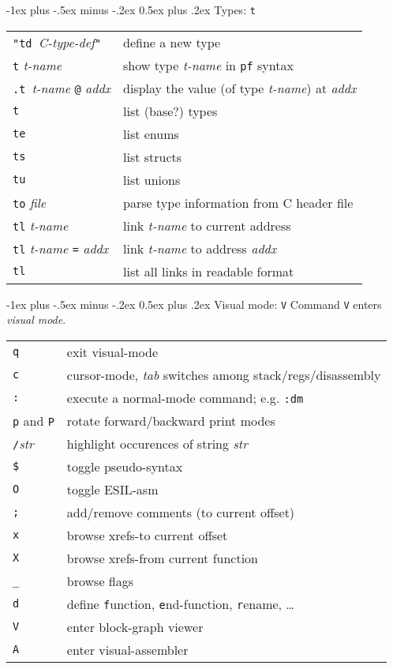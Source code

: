 \documentclass[a4paper,landscape]{article}
\makeatletter
\renewcommand{\section}{\@startsection{section}{1}{0mm}%
                                {-1ex plus -.5ex minus -.2ex}%
                                {0.5ex plus .2ex}%
                                {\normalfont\large\bfseries}}
\makeatother
\begin{document}
\begin{multicols*}{3}
\section{Types: \texttt{t}}
\begin{tabular}{@{}ll@{}}
\texttt{"td\ }\textit{C-type-def}\texttt{"} & define a new type \\
\texttt{t} \textit{t-name} & show type \textit{t-name} in \texttt{pf} syntax \\
\texttt{.t }\textit{t-name} \texttt{@} \textit{addx} & display the value (of type \textit{t-name}) at \textit{addx} \\
\texttt{t} & list (base?) types \\
\texttt{te} & list enums \\
\texttt{ts} & list structs \\
\texttt{tu} & list unions \\
\texttt{to} \textit{file} & parse type information from C header file \\
\texttt{tl} \textit{t-name} & link \textit{t-name} to current address \\
\texttt{tl} \textit{t-name} \texttt{=} \textit{addx} & link \textit{t-name} to address \textit{addx} \\
\texttt{tl} & list all links in readable format \\
\end{tabular}

\section{Visual mode: \texttt{V}}
Command \texttt{V} enters \emph{visual mode}.

\begin{tabular}{@{}ll@{}}
\texttt{q} & exit visual-mode \\
\texttt{c} & cursor-mode, \textit{tab} switches among stack/regs/disassembly \\
\texttt{:} & execute a normal-mode command; e.g. \texttt{:dm} \\
\texttt{p} and \texttt{P} & rotate forward/backward print modes \\
\texttt{/}\textit{str} & highlight occurences of string \textit{str} \\
\texttt{\$} & toggle pseudo-syntax \\
\texttt{O} & toggle ESIL-asm \\
\texttt{;} & add/remove comments (to current offset) \\
\texttt{x} & browse xrefs-to current offset \\
\texttt{X} & browse xrefs-from current function \\
\texttt{\_} & browse flags \\
\texttt{d} & define \texttt{f}unction, \texttt{e}nd-function, \texttt{r}ename, \ldots \\
\texttt{V} & enter block-graph viewer \\
\texttt{A} & enter visual-assembler \\
\end{tabular}

\end{multicols*}
\end{document}
